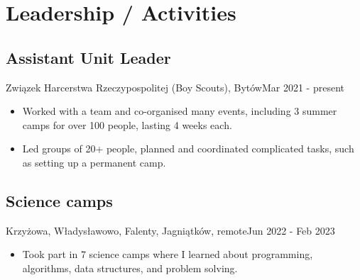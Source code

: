 \section{Leadership / Activities}
\subsection{Assistant Unit Leader}{Związek Harcerstwa Rzeczypospolitej (Boy Scouts), Bytów}{Mar 2021 - present}
\begin{itemize}
    \item Worked with a team and co-organised many events, including 3 summer camps for over 100 people, lasting 4 weeks each. 
    \item Led groups of 20+ people, planned and coordinated complicated tasks, such as setting up a permanent camp.
\end{itemize}

\subsection{Science camps}{Krzyżowa, Władysławowo, Falenty, Jagniątków, remote}{Jun 2022 - Feb 2023}
\begin {itemize}
    \item Took part in 7 science camps where I learned about programming, algorithms, data structures, and problem solving.
\end{itemize}

\vspace{1em}
